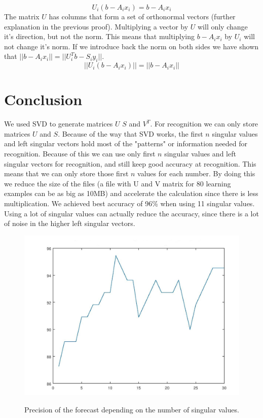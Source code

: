 \documentclass[12pt]{article}
\begin{document}
\[
U_i(b - A_ix_i) = b - A_ix_i
\]
\newline
The matrix $U$ has columns that form a set of orthonormal vectors (further explanation in the previous proof). Multiplying a vector by $U$ will only change it's direction, but not the norm. This means that multiplying $b - A_ix_i$ by $U_i$ will not change it's norm. If we introduce back the norm on both sides we have shown that $||b - A_ix_i|| = ||U_i^{T}b - S_iy_i||$. \\
\[
||U_i(b - A_ix_i)|| = ||b - A_ix_i||
\]

\newpage
\section{Conclusion}

We used SVD to generate matrices $U$ $S$ and $V^T$. For recognition we can only store matrices $U$ and $S$. Because of the way that SVD works, the first $n$ singular values and left singular vectors hold most of the "patterns" or information needed for recognition. Because of this we can use only first $n$ singular values and left singular vectors for recognition, and still keep good accuracy at recognition. This means that we can only store those first $n$ values for each number. By doing this we reduce the size of the files (a file with U and V matrix for 80 learning examples can be as big as 10MB) and accelerate the calculation since there is less multiplication. We achieved best accuracy of 96\% when using 11 singular values. Using a lot of singular values can actually reduce the accuracy, since there is a lot of noise in the higher left singular vectors.

\begin{figure}[h]
	\centering
	\includegraphics[clip,scale=0.68]{images/error_graph.png}\underline{}
	\caption[Precision of the forecast]{Precision of the forecast depending on the number of singular values.}
	
\end{figure}
\end{document}
